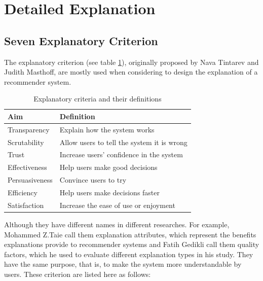 \section{Detailed Explanation}
    \subsection{Seven Explanatory Criterion}
        \indent The explanatory criterion\cite{tintarev2007survey} (see table \ref{table:1}), originally proposed by Nava Tintarev and Judith Masthoff, 
        are mostly used when considering to design the explanation of a recommender system. 

        \begin{table}[ht] 
            \centering
            \begin{tabular}{ | m{8em} | m{4cm} | }
            \hline
            \bfseries Aim & \bfseries Definition\\ [0.5ex] 
            \hline\hline
            Transparency & Explain how the system works\\ 
            \hline
            Scrutability & Allow users to tell the system it is wrong\\ 
            \hline
            Trust & Increase users' confidence in the system\\ 
            \hline
            Effectiveness & Help users make good decisions\\ 
            \hline
            Persuasiveness & Convince users to try\\ 
            \hline
            Efficiency & Help users make decisions faster\\ 
            \hline
            Satisfaction & Increase the ease of use or enjoyment\\ 
            \hline
            \end{tabular}
            \caption{Explanatory criteria and their definitions}
            \label{table:1}
        \end{table}
        \indent Although they have different names in different researches. For example, 
        Mohammed Z.Taie call them explanation attributes\cite{al2013explanations},
        which represent the benefits explanations provide to recommender systems and Fatih Gedikli call them quality factors, 
        which he used to evaluate different explanation types in his study\cite{gedikli2014should}.
        They have the same purpose, that is, to make the system more understandable by users.
        These criterion are listed here as follows:
        
